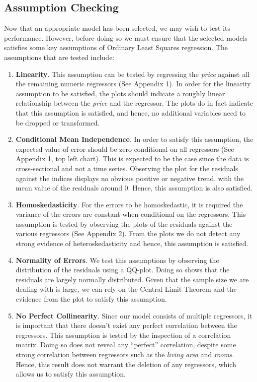 \documentclass[letterpaper,9pt,twocolumn,twoside,]{pinp}
\providecommand{\tightlist}{%
  \setlength{\itemsep}{0pt}\setlength{\parskip}{0pt}}
\begin{document}
\hypertarget{assumption-checking}{%
\subsection{\texorpdfstring{\textbf{Assumption
Checking}}{Assumption Checking}}\label{assumption-checking}}

Now that an appropriate model has been selected, we may wish to test its
performance. However, before doing so we must ensure that the selected
models satisfies some key assumptions of Ordinary Least Squares
regression. The assumptions that are tested include:

\begin{enumerate}
\def\labelenumi{\arabic{enumi}.}
\tightlist
\item
  \textbf{Linearity}. This assumption can be tested by regressing the
  \emph{price} against all the remaining numeric regressors (See
  Appendix 1). In order for the linearity assumption to be satisfied,
  the plots should indicate a roughly linear relationship between the
  \emph{price} and the regressor. The plots do in fact indicate that
  this assumption is satisfied, and hence, no additional variables need
  to be dropped or transformed.
\item
  \textbf{Conditional Mean Independence}. In order to satisfy this
  assumption, the expected value of error should be zero conditional on
  all regressors (See Appendix 1, top left chart). This is expected to
  be the case since the data is cross-sectional and not a time series.
  Observing the plot for the residuals against the indices displays no
  obvious positive or negative trend, with the mean value of the
  residuals around 0. Hence, this assumption is also satisfied.
\item
  \textbf{Homoskedasticity}. For the errors to be homoskedastic, it is
  required the variance of the errors are constant when conditional on
  the regressors. This assumption is tested by observing the plots of
  the residuals against the various regressors (See Appendix 2). From
  the plots we do not detect any strong evidence of heteroskedasticity
  and hence, this assumption is satisfied.
\item
  \textbf{Normality of Errors}. We test this assumptions by observing
  the distribution of the residuals using a QQ-plot. Doing so shows that
  the residuals are largely normally distributed. Given that the sample
  size we are dealing with is large, we can rely on the Central Limit
  Theorem and the evidence from the plot to satisfy this assumption.
\item
  \textbf{No Perfect Collinearity}. Since our model consists of multiple
  regressors, it is important that there doesn't exist any perfect
  correlation between the regressors. This assumption is tested by the
  inspection of a correlation matrix. Doing so does not reveal any
  ``perfect'' correlation, despite some strong correlation between
  regressors such as the \emph{living area} and \emph{rooms}. Hence,
  this result does not warrant the deletion of any regressors, which
  allows us to satisfy this assumption.
\end{enumerate}
\end{document}
